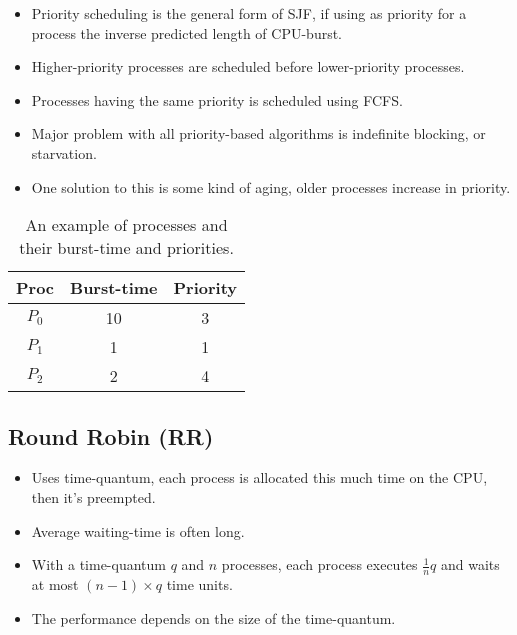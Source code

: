 \documentclass{beamer}
\begin{document}
\begin{frame}{\insertsubsectionhead}
  \begin{itemize}
    \item Priority scheduling is the general form of SJF, if using as priority 
      for a process the inverse predicted length of CPU-burst.

    \item Higher-priority processes are scheduled before lower-priority 
      processes.

    \item Processes having the same priority is scheduled using FCFS.

    \item Major problem with all priority-based algorithms is indefinite 
      blocking, or starvation.

    \item One solution to this is some kind of aging, older processes increase 
      in priority.

  \end{itemize}
\end{frame}

\begin{frame}{\insertsubsectionhead}
  \begin{table}
    \begin{tabular}{ccc}
      \textbf{Proc} & \textbf{Burst-time} & \textbf{Priority} \\
      \toprule
      \(P_0\)   & 10  & 3 \\
      \(P_1\)   & 1   & 1 \\
      \(P_2\)   & 2   & 4 \\
      \bottomrule
    \end{tabular}
    \caption{An example of processes and their burst-time and priorities.}
  \end{table}
\end{frame}

\subsection{Round Robin (RR)}

\begin{frame}{\insertsubsectionhead}
  \begin{itemize}
    \item Uses time-quantum, each process is allocated this much time on the 
      CPU, then it's preempted.

    \item Average waiting-time is often long.

    \item With a time-quantum \(q\) and \(n\) processes, each process executes 
      \(\frac{1}{n} q\) and waits at most \( (n-1)\times q\) time units.

    \item The performance depends on the size of the time-quantum.

  \end{itemize}
\end{frame}
\end{document}
